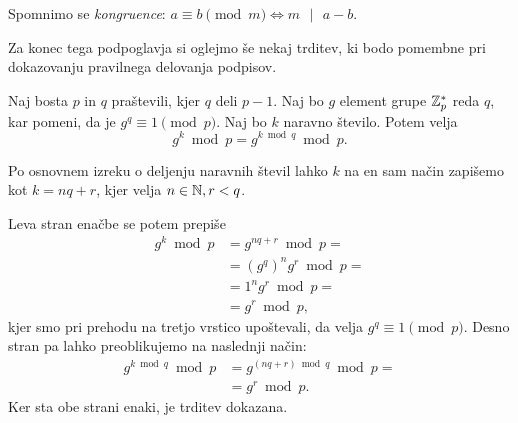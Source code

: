 \begin{opomba}
    Spomnimo se \textit{kongruence}: $a \equiv b \pmod m \iff m \text{ }|\text{ } a - b$.
\end{opomba}

Za konec tega podpoglavja si oglejmo še nekaj trditev, ki bodo pomembne pri dokazovanju pravilnega
delovanja podpisov.

\begin{trditev}
\label{trd:mod-q}
    Naj bosta $p$ in $q$ praštevili, kjer $q$ deli $p - 1$. Naj bo $g$ element grupe $\mathbb Z_p^*$ reda
    $q$, kar pomeni, da je $g^q \equiv 1 \pmod p$. Naj bo $k$
    naravno število. Potem velja 
    $$ 
    g^k \bmod p = g^{k \bmod q} \bmod p.
    $$
\end{trditev}
\begin{dokaz}
    Po osnovnem izreku o deljenju naravnih števil lahko $k$ na en sam način zapišemo kot $k = nq + r$, 
    kjer velja $n \in \mathbb N, r < q$.

    Leva stran enačbe se potem prepiše 
    \begin{align*}
        g^k \bmod p &= g^{nq + r} \bmod p = \\
                    &= (g^q)^n g^r \bmod p = \\
                    &= 1^n g^r \bmod p = \\
                    &= g^r \bmod p,
    \end{align*}
    kjer smo pri prehodu na tretjo vrstico upoštevali, da velja $g^q \equiv 1 \pmod p$. Desno stran
    pa lahko preoblikujemo na naslednji način:
    \begin{align*}
        g^{k \bmod q} \bmod p &= g^{(nq + r) \bmod q} \bmod p = \\ 
                              &= g^r \bmod p.
    \end{align*}
    Ker sta obe strani enaki, je trditev dokazana.
\end{dokaz}

